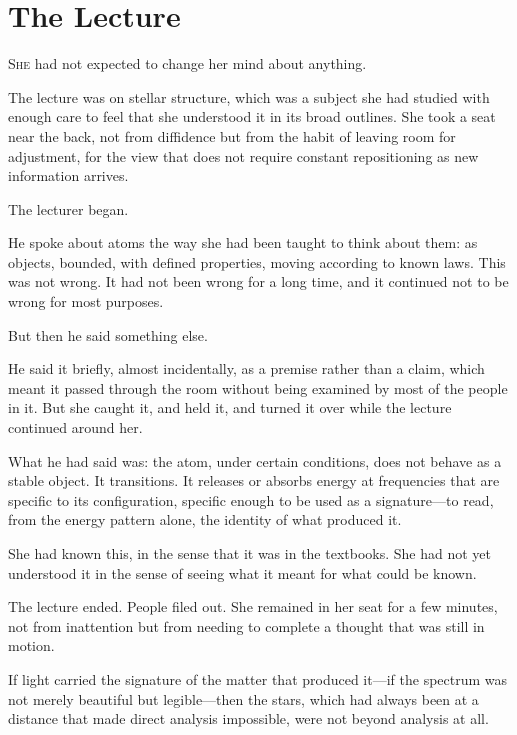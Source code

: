 
\chapter{The Lecture}


\lettrine{S}{he} had not expected to change her mind about
anything.

The lecture was on stellar structure, which was a subject she
had studied with enough care to feel that she understood it in
its broad outlines. She took a seat near the back, not from
diffidence but from the habit of leaving room for adjustment,
for the view that does not require constant repositioning as
new information arrives.

The lecturer began.

He spoke about atoms the way she had been taught to think
about them: as objects, bounded, with defined properties,
moving according to known laws. This was not wrong. It had not
been wrong for a long time, and it continued not to be wrong
for most purposes.

But then he said something else.

He said it briefly, almost incidentally, as a premise
rather than a claim, which meant it passed through the room
without being examined by most of the people in it. But she
caught it, and held it, and turned it over while the lecture
continued around her.

What he had said was: the atom, under certain conditions, does
not behave as a stable object. It transitions. It releases
or absorbs energy at frequencies that are specific to its
configuration, specific enough to be used as a signature---to
read, from the energy pattern alone, the identity of what
produced it.

She had known this, in the sense that it was in the textbooks.
She had not yet understood it in the sense of seeing what it
meant for what could be known.

\scenebreak

The lecture ended. People filed out. She remained in her seat
for a few minutes, not from inattention but from needing
to complete a thought that was still in motion.

If light carried the signature of the matter that produced it---if
the spectrum was not merely beautiful but legible---then the
stars, which had always been at a distance that made direct
analysis impossible, were not beyond analysis at all.

